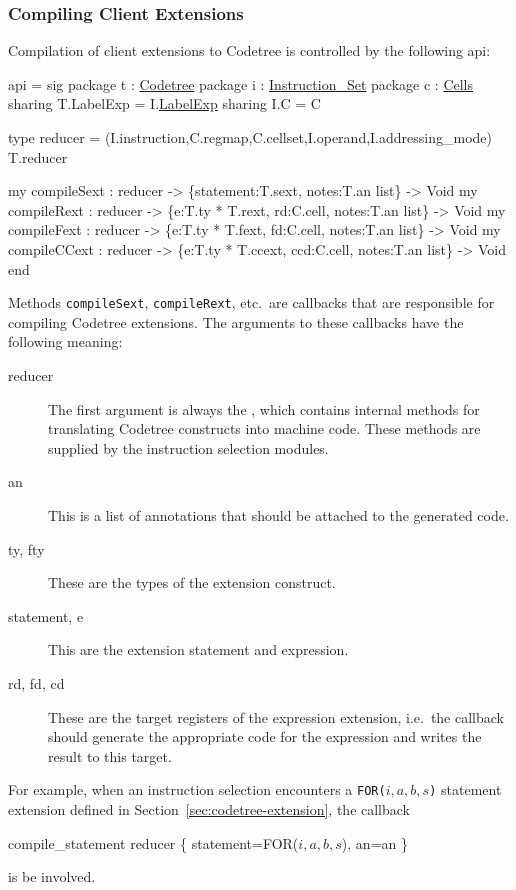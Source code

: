 \subsubsection{Compiling Client Extensions}

Compilation of client extensions to Codetree is controlled by the
following api: 
\begin{SML}
api  =
sig
   package t : \href{codetree.html}{Codetree}
   package i : \href{instructions.html}{Instruction_Set}
   package c : \href{cells.html}{Cells}
      sharing T.LabelExp = I.\href{labelexp.html}{LabelExp}
      sharing I.C = C

   type reducer = 
     (I.instruction,C.regmap,C.cellset,I.operand,I.addressing_mode) T.reducer

   my compileSext : reducer -> \{statement:T.sext, notes:T.an list\} -> Void
   my compileRext : reducer -> \{e:T.ty * T.rext, rd:C.cell, notes:T.an list\} -> Void
   my compileFext : reducer -> \{e:T.ty * T.fext, fd:C.cell, notes:T.an list\} -> Void
   my compileCCext : reducer -> \{e:T.ty * T.ccext, ccd:C.cell, notes:T.an list\} -> Void
end
\end{SML}

Methods \verb|compileSext|, \verb|compileRext|, etc.~are callbacks that
are responsible for compiling Codetree extensions.  The arguments
to these callbacks have the following meaning:
\begin{description}
  \item[reducer] The first argument is always the , 
which contains internal methods for translating Codetree constructs
into machine code.  These methods are supplied by the instruction
selection modules.
  \item[an] This is a list of annotations that should be attached to the
generated code.
  \item[ty, fty] These are the types of the extension construct.
  \item[statement, e] This are the extension statement and expression.
  \item[rd, fd, cd] These are the target registers of the 
expression extension, i.e.~the callback should generate the appropriate
code for the expression and writes the result to this target.
\end{description}

For example, when an instruction selection encounters a
\verb|FOR(|$i,a,b,s$\verb|)| statement extension
defined in Section~\ref{sec:codetree-extension}, the callback
\begin{SML}   
  compile_statement reducer \{ statement=FOR(\(i,a,b,s\)), an=an \}
\end{SML}
\noindent is be involved. 

